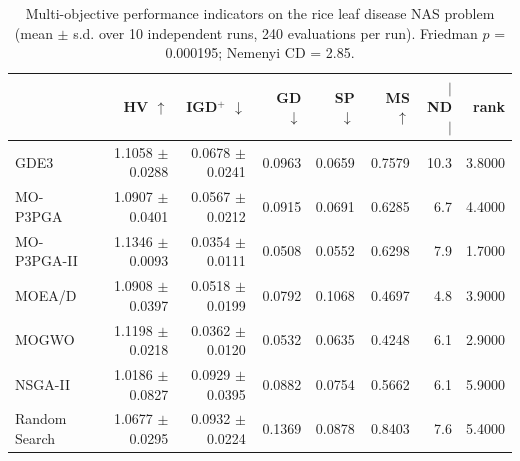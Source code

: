 \begin{table}[htbp]
\centering
\caption{Multi-objective performance indicators on the rice leaf disease NAS problem (mean $\pm$ s.d. over 10 independent runs, 240 evaluations per run). Friedman $p$ = 0.000195; Nemenyi CD = 2.85.}
\label{tab:indicators}
\footnotesize
\begin{tabular}{lrrrrrrr}
\toprule
 & HV $\uparrow$ & IGD$^+$ $\downarrow$ & GD $\downarrow$ & SP $\downarrow$ & MS $\uparrow$ & $|$ND$|$ & rank \\
\midrule
GDE3 & 1.1058 $\pm$ 0.0288 & 0.0678 $\pm$ 0.0241 & 0.0963 & 0.0659 & 0.7579 & 10.3 & 3.8000 \\
MO-P3PGA & 1.0907 $\pm$ 0.0401 & 0.0567 $\pm$ 0.0212 & 0.0915 & 0.0691 & 0.6285 & 6.7 & 4.4000 \\
MO-P3PGA-II & 1.1346 $\pm$ 0.0093 & 0.0354 $\pm$ 0.0111 & 0.0508 & 0.0552 & 0.6298 & 7.9 & 1.7000 \\
MOEA/D & 1.0908 $\pm$ 0.0397 & 0.0518 $\pm$ 0.0199 & 0.0792 & 0.1068 & 0.4697 & 4.8 & 3.9000 \\
MOGWO & 1.1198 $\pm$ 0.0218 & 0.0362 $\pm$ 0.0120 & 0.0532 & 0.0635 & 0.4248 & 6.1 & 2.9000 \\
NSGA-II & 1.0186 $\pm$ 0.0827 & 0.0929 $\pm$ 0.0395 & 0.0882 & 0.0754 & 0.5662 & 6.1 & 5.9000 \\
Random Search & 1.0677 $\pm$ 0.0295 & 0.0932 $\pm$ 0.0224 & 0.1369 & 0.0878 & 0.8403 & 7.6 & 5.4000 \\
\bottomrule
\end{tabular}
\end{table}
